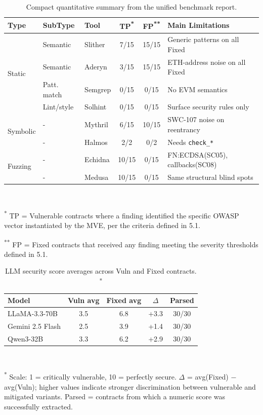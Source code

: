 \begin{table}[!t]
\centering
\scriptsize
\setlength{\tabcolsep}{3.0pt}
\caption{Compact quantitative summary from the unified benchmark report.}
\label{tab:tool_summary}
\begin{tabular}{@{}lllccp{2.4cm}@{}}
\hline
\textbf{Type} & \textbf{SubType} & \textbf{Tool} & \textbf{TP\textsuperscript{*}} & \textbf{FP\textsuperscript{**}} & \textbf{Main Limitations} \\
\hline
\multirow{4}{*}{Static}
  & Semantic & Slither  & 7/15 & 15/15 & Generic patterns on all Fixed \\
  & Semantic & Aderyn   & 3/15 & 15/15 & ETH-address noise on all Fixed \\
  & Patt. match & Semgrep  & 0/15 & 0/15 & No EVM semantics \\
  & Lint/style & Solhint  & 0/15 & 0/15 & Surface security rules only \\
\hline
\multirow{2}{*}{Symbolic}
  & - & Mythril  & 6/15 & 10/15 & SWC-107 noise on reentrancy \\
  & - & Halmos & 2/2 & 0/2 & Needs \texttt{check\_*}\\
\hline
\multirow{2}{*}{Fuzzing}
  & - & Echidna  & 10/15 & 0/15 & FN:ECDSA(SC05), callbacks(SC08) \\
  & - & Medusa   & 10/15 & 0/15 & Same structural blind spots \\
\hline
\end{tabular}\\[3pt]
\parbox{\columnwidth}{\scriptsize\textsuperscript{*} TP = Vulnerable contracts where a finding identified the specific OWASP vector instantiated by the MVE, per the criteria defined in 5.1.}
\parbox{\columnwidth}{\scriptsize\textsuperscript{**} FP = Fixed contracts that received any finding meeting the severity thresholds defined in 5.1.}
\end{table}

\begin{table}[!t]
\centering
\scriptsize
\setlength{\tabcolsep}{3.5pt}
\caption{LLM security score averages across Vuln and Fixed contracts. \textsuperscript{*}}
\label{tab:llm_summary}
\begin{tabular}{@{}lcccc@{}}
\hline
\textbf{Model} & \textbf{Vuln avg} & \textbf{Fixed avg} & \textbf{$\Delta$} & \textbf{Parsed} \\
\hline
LLaMA-3.3-70B  & 3.5 & 6.8 & +3.3 & 30/30 \\
Gemini 2.5 Flash & 2.5 & 3.9 & +1.4 & 30/30 \\
Qwen3-32B      & 3.3 & 6.2 & +2.9 & 30/30 \\
\hline
\end{tabular}\\[3pt]
\parbox{\columnwidth}{\scriptsize%
\textsuperscript{*} Scale: 1 = critically vulnerable, 10 = perfectly secure. $\Delta$ = avg(Fixed) $-$ avg(Vuln); higher values indicate stronger discrimination between vulnerable and mitigated variants. Parsed = contracts from which a numeric score was successfully extracted.}
\end{table}

